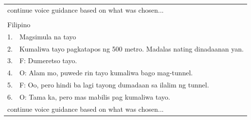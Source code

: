 \begin{table}[h]
\begin{tabular}{ll}
\multicolumn{2}{l}{continue voice guidance based on what was chosen...}                          \\
                        &                                                                        \\ \hline
\multicolumn{2}{l}{Filipino}                                                                     \\ \hline
1.                      & Magsimula na tayo                                                      \\
2.                      & Kumaliwa tayo pagkatapos ng 500 metro. Madalas nating dinadaanan yan.  \\ \hline
\multicolumn{1}{|l}{3.} & \multicolumn{1}{l|}{F: Dumeretso tayo.}                                \\
\multicolumn{1}{|l}{4.} & \multicolumn{1}{l|}{O: Alam mo, puwede rin tayo kumaliwa bago mag-tunnel.}          \\
\multicolumn{1}{|l}{5.} & \multicolumn{1}{l|}{F: Oo, pero hindi ba lagi tayong dumadaan sa ilalim ng tunnel.} \\
\multicolumn{1}{|l}{6.} & \multicolumn{1}{l|}{O: Tama ka, pero mas mabilis pag kumaliwa tayo.}                \\ \hline
\multicolumn{2}{l}{continue voice guidance based on what was chosen...}                          \\ \hline
\end{tabular}
\end{table}

